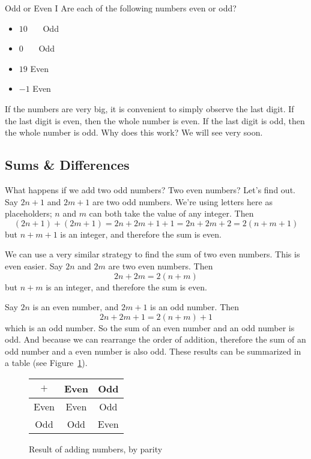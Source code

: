 \documentclass[a4paper,10pt]{report}
\begin{document}
\begin{problem}{Odd or Even I}
 Are each of the following numbers even or odd?

 \begin{itemize}
  \item \(10\) \hfill {}~~~Odd
  \item \(0\) \hfill {}~~~Odd
  \item \(19\) \hfill Even~~~
  \item \(-1\) \hfill Even~~~
 \end{itemize}
\end{problem}

If the numbers are very big, it is convenient to simply observe the last digit.
If the last digit is even, then the whole number is even. If the last digit is
odd, then the whole number is odd. Why does this work? We will see very soon.

\subsection{Sums \& Differences}

What happens if we add two odd numbers? Two even numbers? Let's find out. Say
\(2n+1\) and \(2m+1\) are two odd numbers. We're using letters here as
placeholders; \(n\) and \(m\) can both take the value of any integer. Then \[
(2n+1) + (2m+1) = 2n + 2m + 1 + 1 = 2n + 2m + 2 = 2(n+m+1) \] but \(n+m+1\) is
an integer, and therefore the sum is even.

We can use a very similar strategy to find the sum of two even numbers. This is
even easier. Say \(2n\) and \(2m\) are two even numbers. Then \[
 2n + 2m = 2(n+m)
\] but \(n+m\) is an integer, and therefore the sum is even.

Say \(2n\) is an even number, and \(2m+1\) is an odd number. Then \[
 2n + 2m + 1 = 2(n+m) + 1
\] which is an odd number. So the sum of an even number and an odd number is
odd. And because we can rearrange the order of addition, therefore the sum of an
odd number and a even number is also odd. These results can be summarized in a
table (see Figure~\ref{pd:psumt}).

\begin{figure}
 \begin{tabular}{c|cc}
  \(+\) & Even & Odd  \\
  \hline
  Even   & Even & Odd \\
  Odd    & Odd & Even
 \end{tabular}

 \caption{Result of adding numbers, by parity}
 \label{pd:psumt}
\end{figure}
\end{document}
